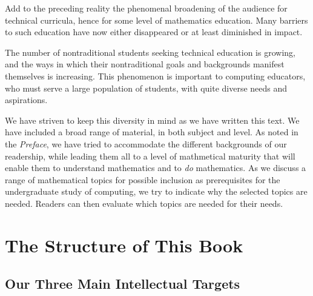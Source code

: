 \medskip

Add to the preceding reality the phenomenal broadening of the audience
for technical curricula, hence for some level of mathematics
education.  Many barriers to such education have now either
disappeared or at least diminished in impact.

\medskip

The number of nontraditional students seeking technical education is
growing, and the ways in which their nontraditional goals and
backgrounds manifest themselves is increasing.  This phenomenon is
important to computing educators, who must serve a large population of
students, with quite diverse needs and aspirations.

We have striven to keep this diversity in mind as we have written this
text.  We have included a broad range of material, in both subject and
level.  As noted in the {\it Preface}, we have tried to accommodate
the different backgrounds of our readership, while leading them all to
a level of mathmetical maturity that will enable them to understand
mathematics and to {\em do} mathematics.  As we
discuss a range of mathematical topics for possible inclusion as
prerequisites for the undergraduate study of computing, we try to
indicate why the selected topics are needed.  Readers can then
evaluate which topics are needed for their needs.

\section{The Structure of This Book}
\label{sec:thisbook}

\subsection{Our Three Main Intellectual Targets}
\label{sec:book-overwiew}

